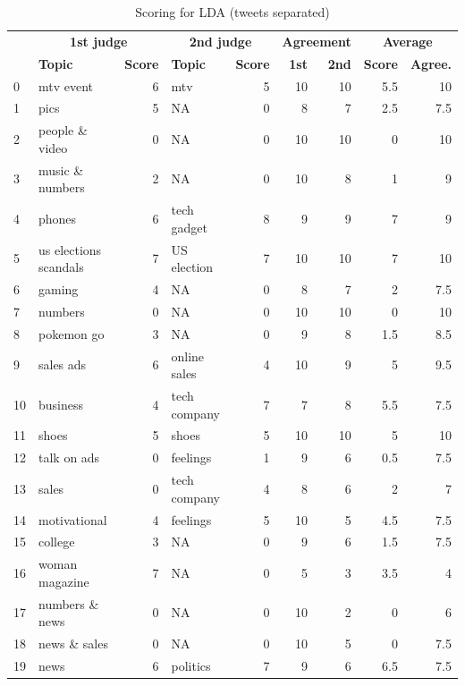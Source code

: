 \documentclass[11pt]{article}
\begin{document}
\begin{appendices}
\begin{table}[H]
	\centering
	\begin{tabular}{| l | l | r | l | r | r | r | r | r |}
		\hline
		& \multicolumn{2}{c|}{\textbf{1st judge}} & \multicolumn{2}{c|}{\textbf{2nd judge}} & \multicolumn{2}{c|}{\textbf{Agreement}} & \multicolumn{2}{c|}{\textbf{Average}}\\
        \cline{2-9}
         & \textbf{Topic} & \textbf{Score} & \textbf{Topic} & \textbf{Score} & \textbf{1st} & \textbf{2nd} & \textbf{Score} & \textbf{Agree.}\\
		\hline
            0 & mtv event & 6 & mtv & 5 & 10 & 10 & 5.5 & 10\\
            1 & pics & 5 & NA & 0 & 8 & 7 & 2.5 & 7.5\\
            2 & people \& video & 0 & NA & 0 & 10 & 10 & 0 & 10\\
            3 & music \& numbers & 2 & NA & 0 & 10 & 8 & 1 & 9\\
            4 & phones & 6 & tech gadget & 8 & 9 & 9 & 7 & 9\\
            5 & us elections scandals & 7 & US election & 7 & 10 & 10 & 7 & 10\\
            6 & gaming & 4 & NA & 0 & 8 & 7 & 2 & 7.5\\
            7 & numbers & 0 & NA & 0 & 10 & 10 & 0 & 10\\
            8 & pokemon go & 3 & NA & 0 & 9 & 8 & 1.5 & 8.5\\
            9 & sales ads & 6 & online sales & 4 & 10 & 9 & 5 & 9.5\\
            10 & business & 4 & tech company & 7 & 7 & 8 & 5.5 & 7.5\\
            11 & shoes & 5 & shoes & 5 & 10 & 10 & 5 & 10\\
            12 & talk on ads & 0 & feelings & 1 & 9 & 6 & 0.5 & 7.5\\
            13 & sales & 0 & tech company & 4 & 8 & 6 & 2 & 7\\
            14 & motivational & 4 & feelings & 5 & 10 & 5 & 4.5 & 7.5\\
            15 & college & 3 & NA & 0 & 9 & 6 & 1.5 & 7.5\\
            16 & woman magazine & 7 & NA & 0 & 5 & 3 & 3.5 & 4\\
            17 & numbers \& news & 0 & NA & 0 & 10 & 2 & 0 & 6\\
            18 & news \& sales & 0 & NA & 0 & 10 & 5 & 0 & 7.5\\
            19 & news & 6 & politics & 7 & 9 & 6 & 6.5 & 7.5\\
		\hline
	\end{tabular}
	\caption{Scoring for LDA (tweets separated)}
	\label{tb:res_lda_sep}
\end{table}


\end{appendices}
\end{document}
